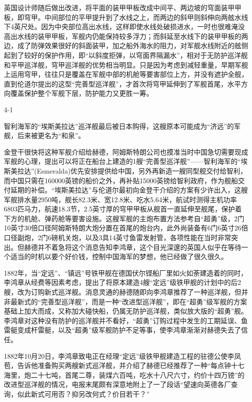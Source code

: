 \documentclass[12pt,UTF8]{ctexbook}
\begin{document}
英国设计师随后做出改进，将平面的装甲甲板改成中间平、两边坡的穹面装甲甲板，即穹甲。中间部位的平甲提升到了水线之上，而两边的斜甲则斜伸向两舷水线下4英尺处。因为中央部位高出水线，这样即使水线处破损进水，一时也很难淹没高出水线的装甲甲板，军舰内仍能保持较多浮力；而斜延至水线下的装甲甲板的两边，成了防弹效果很好的斜面装甲，加之船外海水的阻力，对军舰水线附近的舷侧起到了较好的保护作用，即“以斜度拒弹，以穹面界隔漏水”，相对于无防护巡洋舰和平甲巡洋舰，穹甲巡洋舰的优势相当明显。只是因为考虑到减轻重量，早期军舰上运用穹甲，往往只是覆盖在军舰中部的机舱等要害部位上方，并没有遮护全舰，直到伦道尔提出的这型“完善型巡洋舰”，才首次将穹甲延伸到了军舰首尾，水平方向覆盖保护整个军舰下层，防护能力又更胜一筹。

4-1

智利海军的“埃斯美拉达”巡洋舰最后被日本购得，这艘原本可能成为“济远”的军舰，后来被更名为“和泉”。

金登干很快将这种军舰介绍给赫德，阿姆斯特朗公司也摸准当时中国急切需要现成军舰的心理，提出可以将正在船台上建造的1艘“完善型巡洋舰”——智利海军的“埃斯美拉达”(Esmeralda)优先安排提供给中国，另外再新造一艘同型舰交付给智利，而中国只需在160000英镑的船价之外，再补贴15000英镑给智利政府，作为舰船交付延期的补偿。“埃斯美拉达”与伦道尔最初向金登干介绍的方案有少许出入，这艘军舰排水量2950吨，舰长82.3米、宽12.8米、吃水5.64米，航试时测得主机功率6803匹马力，航速18.3节，2.5英寸厚的穹甲甲板从舰首一直延伸至舰尾，保护着下方的机舱、弹药舱等要害设施。这艘军舰的主炮布置方法参考自“超勇”级，2门10英寸30倍口径阿姆斯特朗大炮分置在首尾的炮台内，此外尚装备有6门6英寸26倍口径副炮，2门6磅机关炮，以及3具14英寸鱼雷发射管，各项性能在当时非常突出。但赫德并不着急将这个消息告知李鸿章，这个目光深邃的英国人似乎在等待一个适当的时机以要个好价钱，控制中国海军的梦想，他已经做了很久很久。

1882年，当“定远”、“镇远”号铁甲舰在德国伏尔铿船厂里如火如荼建造着的同时，李鸿章从经费等因素考虑，提出了将原本建造4艘“定远”级铁甲舰的计划中的后2艘，改为订购新式巡洋舰。消息灵通的赫德随即向李鸿章推荐了一种巡洋舰，但并非最新式的“完善型巡洋舰”，而是一种“改进型巡洋舰”，即在“超勇”级军舰的方案基础上加大而成，又称加大碰快船，仍属无防护巡洋舰，类似放大版的“超勇”舰。李鸿章对这种没有防护的巡洋舰并不看好，“超勇”订购过程中发生的工期延误、鱼雷艇变成杆雷艇，以及“超勇”级军舰防护不足等事，使李鸿章渐渐对赫德失去了信任。

1882年10月20日，李鸿章致电正在经理“定远”级铁甲舰建造工程的驻德公使李凤苞，告诉他准备购买两艘新式巡洋舰，并介绍了赫德已经推荐了一种“每点钟十七海里，炮二十七吨，首尾二尊，装煤六百吨，吃水十八尺六寸，约价十四万镑”的改进型巡洋舰的情况，电报末尾颇有深意地附上了一了段话“望速向英德各厂查询，似此新式可用否？抑另改何式？价目若干？”
\end{document}
